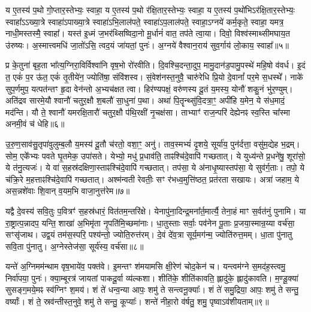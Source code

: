 य ए॒तस्य॑ प॒थो गो॒प्तार॒स्तेभ्यः॒ स्वाहा॒ य ए॒तस्य॑ प॒थो र॑क्षि॒तार॒स्तेभ्यः॒ स्वाहा॒ य ए॒तस्य॑ प॒थो॑भिऽर॑क्षि॒तार॒स्तेभ्यः॒ स्वाहा᳚\-ऽ\-ऽ\-ख्या॒त्रे स्वाहा॑ऽपाख्या॒त्रे स्वाहा॑ऽभि॒लाल॑पते॒ स्वाहा॑ऽ\-प॒लाल॑\-पते॒ स्वाहा॒ऽग्नये॑ कर्म॒कृते॒ स्वाहा॒ यमत्र॒ नाधी॒मस्तस्मै॒ स्वाहा᳚। 
यस्त॑ इ॒ध्मं ज॒भर॑थ्सिष्विदा॒नो मू॒र्धानं॑ वात॒ तप॑ते त्वा॒या। 
दिवो॒ विश्व॑स्माथ्सीमघाय॒त उ॑रुष्यः। 
अ॒स्मात्त्वमधि॑ जा॒तो॑ऽसि॒ त्वद॒यं जा॑यतां॒ पुनः॑। 
अ॒ग्नये॑ वैश्वान॒राय॑ सुव॒र्गाय॑ लो॒काय॒ स्वाहा᳚॥५॥\ip
\anuvakamend[य ए॒तस्य॒ त्वत्पञ्च॑]

प्र के॒तुना॑ बृह॒ता भा᳚त्य॒ग्निरा॒विर्विश्वा॑नि वृष॒भो रो॑रवीति। 
दि॒वश्चि॒दन्ता॒दुप॒ मामु॒दान॑ड॒पामु॒पस्थे॑ महि॒षो व॑वर्ध। 
इ॒दं त॒ एकं॑ प॒र ऊ॑त॒ एकं॑ तृ॒तीये॑न॒ ज्योति॑षा॒ संवि॑शस्व। 
सं॒वेश॑नस्त॒नुवै॒ चारु॑रेधि प्रि॒यो दे॒वानां᳚ पर॒मे स॒धस्थे᳚। 
नाके॑ सुप॒र्णमुप॒ यत्पत॑न्तꣳ हृ॒दा वेन॑न्तो अ॒भ्यच॑क्षत त्वा। 
हिर॑ण्यपक्षं॒ वरु॑णस्य दू॒तं य॒मस्य॒ योनौ॑ शकु॒नं भु॑र॒ण्युम्। 
अति॑द्रव सारमे॒यौ श्वानौ॑ चतुर॒क्षौ श॒बलौ॑ सा॒धुना॑ प॒था। 
अथा॑ पि॒तॄन्थ्सु॑वि॒दत्रा॒ꣳ॒ अपी॑हि य॒मेन॒ ये स॑ध॒मादं॒ मद॑न्ति। 
यौ ते॒ श्वानौ॑ यमरक्षि॒तारौ॑ चतुर॒क्षौ प॑थि॒रक्षी॑ नृ॒चक्ष॑सा। 
ताभ्याꣳ॑ राज॒न्परि॑ देह्येनꣴ स्व॒स्ति चा᳚स्मा अनमी॒वं च॑ धेहि॥६॥\ip

उ॒रु॒ण॒साव॑सु॒तृपा॑वुलुम्ब॒लौ य॒मस्य॑ दू॒तौ च॑रतो॒ वशा॒ꣳ॒ अनु॑। 
ताव॒स्मभ्यं॑ दृ॒शये॒ सूर्या॑य॒ पुन॑र्दत्ता॒ वसु॑म॒द्येह भ॒द्रम्। 
सोम॒ एके᳚भ्यः पवते घृ॒तमेक॒ उपा॑सते। 
येभ्यो॒ मधु॑ प्र॒धाव॑ति॒ ताꣴश्चि॑दे॒वापि॑ गच्छतात्। 
ये युध्य॑न्ते प्र॒धने॑षु॒ शूरा॑सो॒ ये त॑नु॒त्यजः॑। 
ये वा॑ स॒हस्र॑दक्षिणा॒स्ताꣴश्चि॑दे॒वापि॑ गच्छतात्। 
तप॑सा॒ ये अ॑नाधृ॒ष्यास्तप॑सा॒ ये सुव॑र्ग॒ताः। 
तपो॒ ये च॑क्रि॒रे म॒हत्ताꣴश्चि॑दे॒वापि॑ गच्छतात्। 
अश्म॑न्वती रेवतीः॒ सꣳ र॑भध्व॒मुत्ति॑ष्ठत॒ प्रत॑रता सखायः। 
अत्रा॑ जहाम॒ ये अस॒न्नशे॑वाः  शि॒वान् व॒यम॒भि वाजा॒नुत्त॑रेम॥७॥\ip

यद्वै दे॒वस्य॑ सवि॒तुः प॒वित्रꣳ॑ स॒हस्र॑धारं॒  वित॑तम॒न्तरि॑क्षे। 
येनापु॑ना॒दिन्द्र॒मना᳚र्त॒मार्त्यै॒ तेना॒हं माꣳ स॒र्वत॑नुं पुनामि। 
या रा॒ष्ट्रात्प॒न्नादप॒ यन्ति॒ शाखा॑ अ॒भिमृ॑ता नृ॒पति॑मि॒च्छमा॑नाः। 
धा॒तुस्ताः सर्वाः॒ पव॑नेन पू॒ताः प्र॒जया॒स्मान्र॒य्या वर्च॑सा॒ सꣳसृ॑जाथ। 
उद्व॒यं तम॑स॒स्परि॒ पश्य॑न्तो॒ ज्योति॒रुत्त॑रम्। 
दे॒वं दे॑व॒त्रा सूर्य॒मग॑न्म॒ ज्योति॑रुत्त॒मम्। 
धा॒ता पु॑नातु सवि॒ता पु॑नातु। 
अ॒ग्नेस्तेज॑सा॒ सूर्य॑स्य॒ वर्च॑सा॥८॥\ip
\anuvakamend[धे॒ह्युत्त॑रेमा॒ष्टौ च॑]

यन्ते॑ अ॒ग्निमम॑न्थाम वृष॒भाये॑व॒ पक्त॑वे। 
इ॒मन्तꣳ श॑मयामसि क्षी॒रेण॑ चोद॒केन॑ च। 
यन्त्वम॑ग्ने स॒मद॑ह॒स्त्वमु॒ निर्वा॑पया॒ पुनः॑। 
क्या॒म्बूरत्र॑ जायतां पाकदू॒र्वा व्य॑ल्कशा। 
शीति॑के॒ शीति॑कावति॒ ह्लादु॑के॒ ह्लादु॑कावति। 
म॒ण्डू॒क्या॑ सुसङ्ग॒मये॒मꣴ स्व॑ग्निꣳ श॒मय॑। 
शं ते॑ धन्व॒न्या आपः॒ शमु॑ ते सन्त्वनू॒क्याः᳚। 
शं ते॑ समु॒द्रिया॒ आपः॒ शमु॑ ते सन्तु॒ वर्ष्याः᳚। 
शं ते॒ स्रव॑न्तीस्त॒नुवे॒ शमु॑ ते सन्तु॒ कूप्याः᳚। 
शन्ते॑ नीहा॒रो व॑र्\mbox{}षतु॒ शमु॒ पृष्वाऽव॑शीयताम्॥९॥\ip

